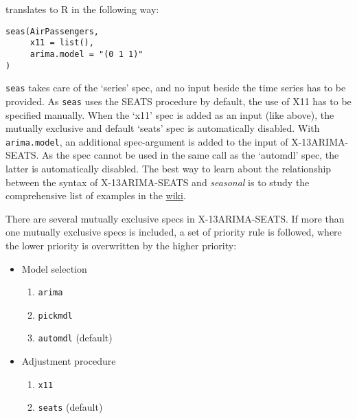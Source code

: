 translates to R in the following way:

\begin{verbatim}
seas(AirPassengers,
     x11 = list(),
     arima.model = "(0 1 1)"
)
\end{verbatim}

\texttt{seas} takes care of the `series' spec, and no input beside the
time series has to be provided. As \texttt{seas} uses the SEATS
procedure by default, the use of X11 has to be specified manually. When
the `x11' spec is added as an input (like above), the mutually exclusive
and default `seats' spec is automatically disabled. With
\texttt{arima.model}, an additional spec-argument is added to the input
of X-13ARIMA-SEATS. As the spec cannot be used in the same call as the
`automdl' spec, the latter is automatically disabled. The best way to
learn about the relationship between the syntax of X-13ARIMA-SEATS and
\emph{seasonal} is to study the comprehensive list of examples in the
\href{https://github.com/christophsax/seasonal/wiki/Examples-of-X-13ARIMA-SEATS-in-R}{wiki}.

There are several mutually exclusive specs in X-13ARIMA-SEATS. If more
than one mutually exclusive specs is included, a set of priority rule is
followed, where the lower priority is overwritten by the higher
priority:

\begin{itemize}
\itemsep1pt\parskip0pt
\item
  Model selection

  \begin{enumerate}
  \def\labelenumi{\arabic{enumi}.}
  \itemsep1pt\parskip0pt
  \item
    \texttt{arima}
  \item
    \texttt{pickmdl}
  \item
    \texttt{automdl} (default)
  \end{enumerate}
\item
  Adjustment procedure

  \begin{enumerate}
  \def\labelenumi{\arabic{enumi}.}
  \itemsep1pt\parskip0pt
  \item
    \texttt{x11}
  \item
    \texttt{seats} (default)
  \end{enumerate}
\end{itemize}


